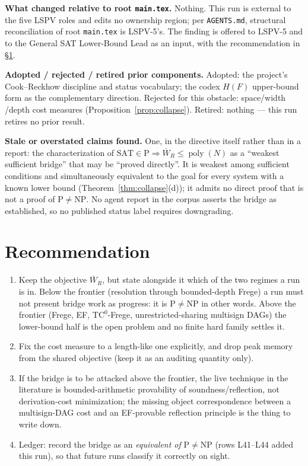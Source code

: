 \documentclass[11pt]{article}
\theoremstyle{definition}
\newcommand{\poly}{\operatorname{poly}}
\newcommand{\Wbar}{\overline W}
\begin{document}
\textbf{What changed relative to root \texttt{main.tex}.} Nothing. This run is
external to the five LSPV roles and edits no ownership region; per
\texttt{AGENTS.md}, structural reconciliation of root \texttt{main.tex} is
LSPV-5's. The finding is offered to LSPV-5 and to the General SAT Lower-Bound
Lead as an input, with the recommendation in \S\ref{sec:rec}.

\textbf{Adopted / rejected / retired prior components.} Adopted: the project's
Cook--Reckhow discipline and status vocabulary; the codex $H(F)$ upper-bound
form as the complementary direction. Rejected for this obstacle: space/width
/depth cost measures (Proposition~\ref{prop:collapse}). Retired: nothing ---
this run retires no prior result.

\textbf{Stale or overstated claims found.} One, in the directive itself rather
than in a report: the characterization of
$\mathrm{SAT}\in\mathrm P\Rightarrow\Wbar_R\le\poly(N)$ as a ``weakest
sufficient bridge'' that may be ``proved directly''. It is weakest among
sufficient conditions and simultaneously equivalent to the goal for every
system with a known lower bound (Theorem~\ref{thm:collapse}(d)); it admits no
direct proof that is not a proof of $\mathrm P\neq\mathrm{NP}$. No agent report
in the corpus asserts the bridge as established, so no published status label
requires downgrading.

\section{Recommendation}\label{sec:rec}

\begin{enumerate}
\item Keep the objective $\Wbar_R$, but state alongside it which of the two
regimes a run is in. Below the frontier (resolution through bounded-depth
Frege) a run must not present bridge work as progress: it is
$\mathrm P\neq\mathrm{NP}$ in other words. Above the frontier (Frege, EF,
$\mathrm{TC}^0$-Frege, unrestricted-sharing multisign DAGs) the lower-bound
half is the open problem and no finite hard family settles it.
\item Fix the cost measure to a length-like one explicitly, and drop peak
memory from the shared objective (keep it as an auditing quantity only).
\item If the bridge is to be attacked above the frontier, the live technique in
the literature is bounded-arithmetic provability of soundness/reflection, not
derivation-cost minimization; the missing object correspondence between a
multisign-DAG cost and an EF-provable reflection principle is the thing to
write down.
\item Ledger: record the bridge as an \emph{equivalent of}
$\mathrm P\neq\mathrm{NP}$ (rows L41--L44 added this run), so that future runs
classify it correctly on sight.
\end{enumerate}
\end{document}
